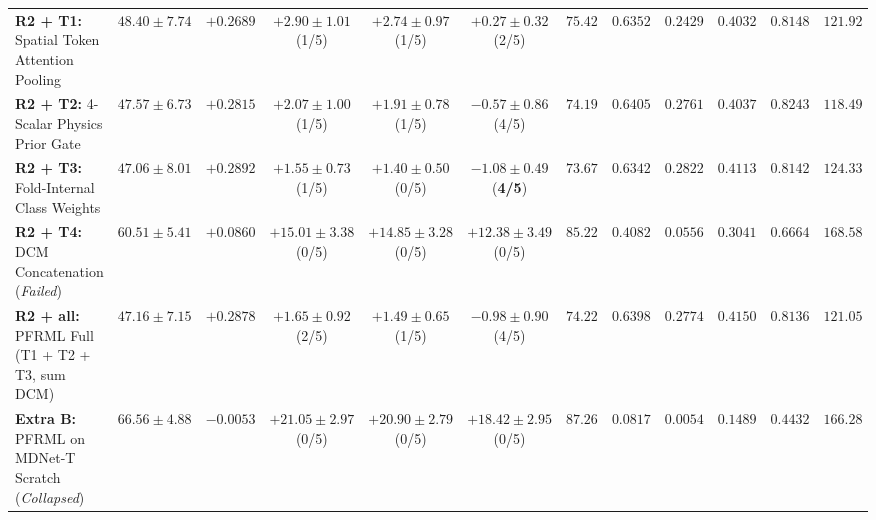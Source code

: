 \documentclass[conference]{IEEEtran}
\begin{document}
\begin{table}[t]
{\begin{tabular}{lccccccccccc}
      \midrule
      \textbf{R2 + T1:} Spatial Token Attention Pooling                  &     $48.40 \pm 7.74$      &     $+0.2689$      &   $+2.90 \pm 1.01$ (1/5)    &   $+2.74 \pm 0.97$ (1/5)    &          $+0.27 \pm 0.32$ (2/5)          &     $75.42$      &     $0.6352$      &      $0.2429$      &     $0.4032$      &             $0.8148$             &     $121.92$      \\
      \textbf{R2 + T2:} 4-Scalar Physics Prior Gate                      &     $47.57 \pm 6.73$      &     $+0.2815$      &   $+2.07 \pm 1.00$ (1/5)    &   $+1.91 \pm 0.78$ (1/5)    &          $-0.57 \pm 0.86$ (4/5)          &     $74.19$      &     $0.6405$      &      $0.2761$      &     $0.4037$      &             $0.8243$             &     $118.49$      \\
      \textbf{R2 + T3:} Fold-Internal Class Weights                      &     $47.06 \pm 8.01$      &     $+0.2892$      &   $+1.55 \pm 0.73$ (1/5)    &   $+1.40 \pm 0.50$ (0/5)    & $\mathbf{-1.08 \pm 0.49}$ (\textbf{4/5}) &     $73.67$      &     $0.6342$      &      $0.2822$      &     $0.4113$      &             $0.8142$             &     $124.33$      \\
      \textbf{R2 + T4:} DCM Concatenation (\textit{Failed})              &     $60.51 \pm 5.41$      &     $+0.0860$      &   $+15.01 \pm 3.38$ (0/5)   &   $+14.85 \pm 3.28$ (0/5)   &         $+12.38 \pm 3.49$ (0/5)          &     $85.22$      &     $0.4082$      &      $0.0556$      &     $0.3041$      &             $0.6664$             &     $168.58$      \\
      \textbf{R2 + all:} PFRML Full (T1 + T2 + T3, sum DCM)              &     $47.16 \pm 7.15$      &     $+0.2878$      &   $+1.65 \pm 0.92$ (2/5)    &   $+1.49 \pm 0.65$ (1/5)    &          $-0.98 \pm 0.90$ (4/5)          &     $74.22$      &     $0.6398$      &      $0.2774$      & $\mathbf{0.4150}$ &             $0.8136$             &     $121.05$      \\
      \midrule
      \textbf{Extra B:} PFRML on MDNet-T Scratch (\textit{Collapsed})    &     $66.56 \pm 4.88$      &     $-0.0053$      &   $+21.05 \pm 2.97$ (0/5)   &   $+20.90 \pm 2.79$ (0/5)   &         $+18.42 \pm 2.95$ (0/5)          &     $87.26$      &     $0.0817$      &      $0.0054$      &     $0.1489$      &             $0.4432$             &     $166.28$      \\
      \bottomrule
    \end{tabular}%
  }
\end{table}
\end{document}
